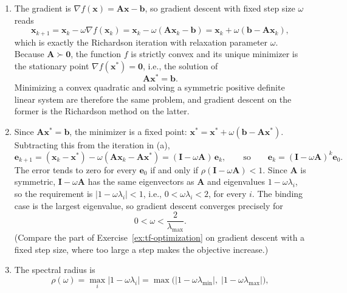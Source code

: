 \begin{solution}
    
    \begin{enumerate}[label=(\alph*)]
        \item The gradient is $\nabla f(\mathbf{x}) = \mathbf{A}\mathbf{x} - \mathbf{b}$, so gradient descent with fixed step size $\omega$ reads
        \[
            \mathbf{x}_{k+1} = \mathbf{x}_k - \omega \nabla f(\mathbf{x}_k) = \mathbf{x}_k - \omega (\mathbf{A}\mathbf{x}_k - \mathbf{b}) = \mathbf{x}_k + \omega (\mathbf{b} - \mathbf{A}\mathbf{x}_k),
        \]
        which is exactly the Richardson iteration with relaxation parameter $\omega$. Because $\mathbf{A} \succ \mathbf{0}$, the function $f$ is strictly convex and its unique minimizer is the stationary point $\nabla f(\mathbf{x}^*) = \mathbf{0}$, i.e., the solution of
        \[
            \mathbf{A}\mathbf{x}^* = \mathbf{b}.
        \]
        Minimizing a convex quadratic and solving a symmetric positive definite linear system are therefore the same problem, and gradient descent on the former is the Richardson method on the latter.
        \item Since $\mathbf{A}\mathbf{x}^* = \mathbf{b}$, the minimizer is a fixed point: $\mathbf{x}^* = \mathbf{x}^* + \omega(\mathbf{b} - \mathbf{A}\mathbf{x}^*)$. Subtracting this from the iteration in (a),
        \[
            \mathbf{e}_{k+1} = (\mathbf{x}_k - \mathbf{x}^*) - \omega(\mathbf{A}\mathbf{x}_k - \mathbf{A}\mathbf{x}^*) = (\mathbf{I} - \omega \mathbf{A})\, \mathbf{e}_k,
            \qquad \text{so} \qquad
            \mathbf{e}_k = (\mathbf{I} - \omega\mathbf{A})^k \mathbf{e}_0.
        \]
        The error tends to zero for every $\mathbf{e}_0$ if and only if $\rho(\mathbf{I} - \omega\mathbf{A}) < 1$. Since $\mathbf{A}$ is symmetric, $\mathbf{I} - \omega\mathbf{A}$ has the same eigenvectors as $\mathbf{A}$ and eigenvalues $1 - \omega\lambda_i$, so the requirement is $|1 - \omega \lambda_i| < 1$, i.e., $0 < \omega \lambda_i < 2$, for every $i$. The binding case is the largest eigenvalue, so gradient descent converges precisely for
        \[
            0 < \omega < \frac{2}{\lambda_{\max}}.
        \]
        (Compare the part of Exercise~\ref{ex:tf-optimization} on gradient descent with a fixed step size, where too large a step makes the objective increase.)
        \item The spectral radius is
        \[
            \rho(\omega) = \max_i |1 - \omega \lambda_i| = \max\big( |1 - \omega\lambda_{\min}|,\; |1 - \omega\lambda_{\max}| \big),
        \]

\end{enumerate}
\end{solution}
